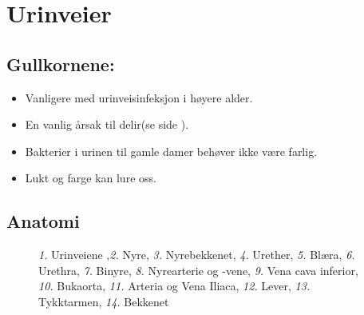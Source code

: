 \chapter{Urinveier}%
		\section{Gullkornene:}
			\begin{itemize}
				\item Vanligere med urinveisinfeksjon i høyere alder.\\
				\item En vanlig årsak til delir(se side \pageref{delir}).\\
				\item Bakterier i urinen til gamle damer behøver ikke være farlig.\\
				\item Lukt og farge kan lure oss.\\
			\end{itemize}
		\section{Anatomi}
					\begin{figure}[ht]
                      \centering
                      \caption{\emph{1.} Urinveiene ,\emph{2.} Nyre, \emph{3.} Nyrebekkenet, \emph{4.} Urether, \emph{5.} Blæra, \emph{6.} Urethra, \emph{7.} Binyre, \emph{8.} Nyrearterie og -vene, \emph{9.} Vena cava inferior, \emph{10.} Bukaorta, \emph{11.} Arteria og Vena Iliaca, \emph{12.} Lever, \emph{13.} Tykktarmen, \emph{14.} Bekkenet}
                    \end{figure}
